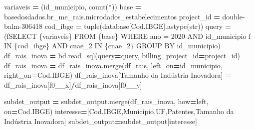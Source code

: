 \documentclass[
  12,
  dvipsnames]{article}
\newenvironment{Shaded}{\begin{snugshade}}{\end{snugshade}}
\newcommand{\BuiltInTok}[1]{#1}
\newcommand{\NormalTok}[1]{#1}
\newcommand{\OperatorTok}[1]{\textcolor[rgb]{0.81,0.36,0.00}{\textbf{#1}}}
\newcommand{\SpecialCharTok}[1]{\textcolor[rgb]{0.00,0.00,0.00}{#1}}
\newcommand{\SpecialStringTok}[1]{\textcolor[rgb]{0.31,0.60,0.02}{#1}}
\newcommand{\StringTok}[1]{\textcolor[rgb]{0.31,0.60,0.02}{#1}}
\begin{document}
\begin{Shaded}
\begin{Highlighting}[]
\NormalTok{variaveis }\OperatorTok{=}\NormalTok{ (}\StringTok{\textquotesingle{}id\_municipio, count(*)\textquotesingle{}}\NormalTok{)}
\NormalTok{base }\OperatorTok{=} \StringTok{\textquotesingle{}\textasciigrave{}basedosdados.br\_me\_rais.microdados\_estabelecimentos\textasciigrave{}\textquotesingle{}}
\NormalTok{project\_id }\OperatorTok{=} \StringTok{\textquotesingle{}double{-}balm{-}306418\textquotesingle{}}
\NormalTok{cod\_ibge }\OperatorTok{=} \BuiltInTok{tuple}\NormalTok{(database[}\StringTok{\textquotesingle{}Cod.IBGE\textquotesingle{}}\NormalTok{].astype(}\BuiltInTok{str}\NormalTok{))}
\NormalTok{query }\OperatorTok{=}\NormalTok{ (}\SpecialStringTok{f\textquotesingle{}SELECT }\SpecialCharTok{\{}\NormalTok{variaveis}\SpecialCharTok{\}}\SpecialStringTok{ FROM }\SpecialCharTok{\{}\NormalTok{base}\SpecialCharTok{\}}\SpecialStringTok{ WHERE ano = 2020 AND id\_municipio\textquotesingle{}} 
         \SpecialStringTok{f\textquotesingle{} IN }\SpecialCharTok{\{}\NormalTok{cod\_ibge}\SpecialCharTok{\}}\SpecialStringTok{ AND cnae\_2 IN }\SpecialCharTok{\{}\NormalTok{cnae\_2}\SpecialCharTok{\}}\SpecialStringTok{ GROUP BY id\_municipio\textquotesingle{}}\NormalTok{)}
\NormalTok{df\_rais\_inova }\OperatorTok{=}\NormalTok{ bd.read\_sql(query}\OperatorTok{=}\NormalTok{query, billing\_project\_id}\OperatorTok{=}\NormalTok{project\_id)}
\NormalTok{df\_rais\_inova }\OperatorTok{=}\NormalTok{ df\_rais\_inova.merge(df\_rais, left\_on}\OperatorTok{=}\StringTok{\textquotesingle{}id\_municipio\textquotesingle{}}\NormalTok{, right\_on}\OperatorTok{=}\StringTok{\textquotesingle{}Cod.IBGE\textquotesingle{}}\NormalTok{)}
\NormalTok{df\_rais\_inova[}\StringTok{\textquotesingle{}Tamanho da Indústria Inovadora\textquotesingle{}}\NormalTok{] }\OperatorTok{=}\NormalTok{ df\_rais\_inova[}\StringTok{\textquotesingle{}f0\_\_x\textquotesingle{}}\NormalTok{]}\OperatorTok{/}\NormalTok{df\_rais\_inova[}\StringTok{\textquotesingle{}f0\_\_y\textquotesingle{}}\NormalTok{]}

\NormalTok{subdet\_output }\OperatorTok{=}\NormalTok{ subdet\_output.merge(df\_rais\_inova, how}\OperatorTok{=}\StringTok{\textquotesingle{}left\textquotesingle{}}\NormalTok{, on}\OperatorTok{=}\StringTok{\textquotesingle{}Cod.IBGE\textquotesingle{}}\NormalTok{)}
\NormalTok{interesse}\OperatorTok{=}\NormalTok{[}\StringTok{\textquotesingle{}Cod.IBGE\textquotesingle{}}\NormalTok{,}\StringTok{\textquotesingle{}Município\textquotesingle{}}\NormalTok{,}\StringTok{\textquotesingle{}UF\textquotesingle{}}\NormalTok{,}\StringTok{\textquotesingle{}Patentes\textquotesingle{}}\NormalTok{,}\StringTok{\textquotesingle{}Tamanho da Indústria Inovadora\textquotesingle{}}\NormalTok{]}
\NormalTok{subdet\_output}\OperatorTok{=}\NormalTok{subdet\_output[interesse]}


\end{Highlighting}
\end{Shaded}
\end{document}
